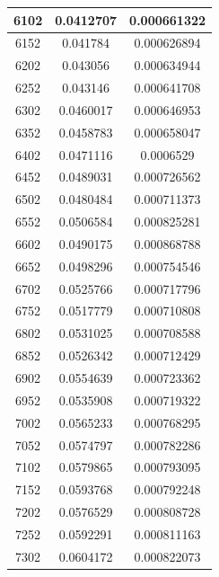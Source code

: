 \documentclass{article}
\begin{document}
\begin{longtable}{|c|c|c|}
		6102	&  0.0412707  	 &  0.000661322  \\ \hline                  
		6152	&  0.041784   	 &  0.000626894  \\ \hline                  
		6202	&  0.043056   	 &  0.000634944  \\ \hline                  
		6252	&  0.043146   	 &  0.000641708  \\ \hline                  
		6302	&  0.0460017  	 &  0.000646953  \\ \hline                  
		6352	&  0.0458783  	 &  0.000658047  \\ \hline                  
		6402	&  0.0471116  	 &  0.0006529    \\ \hline                
		6452	&  0.0489031  	 &  0.000726562  \\ \hline                  
		6502	&  0.0480484  	 &  0.000711373  \\ \hline                  
		6552	&  0.0506584  	 &  0.000825281  \\ \hline                  
		6602	&  0.0490175  	 &  0.000868788  \\ \hline                  
		6652	&  0.0498296  	 &  0.000754546  \\ \hline                  
		6702	&  0.0525766  	 &  0.000717796  \\ \hline                  
		6752	&  0.0517779  	 &  0.000710808  \\ \hline                  
		6802	&  0.0531025  	 &  0.000708588  \\ \hline                  
		6852	&  0.0526342  	 &  0.000712429  \\ \hline                  
		6902	&  0.0554639  	 &  0.000723362  \\ \hline                  
		6952	&  0.0535908  	 &  0.000719322  \\ \hline                  
		7002	&  0.0565233  	 &  0.000768295  \\ \hline                  
		7052	&  0.0574797  	 &  0.000782286  \\ \hline                  
		7102	&  0.0579865  	 &  0.000793095  \\ \hline                  
		7152	&  0.0593768  	 &  0.000792248  \\ \hline                  
		7202	&  0.0576529  	 &  0.000808728  \\ \hline                  
		7252	&  0.0592291  	 &  0.000811163  \\ \hline                  
		7302	&  0.0604172  	 &  0.000822073  \\ \hline                  

\end{longtable}
\end{document}
